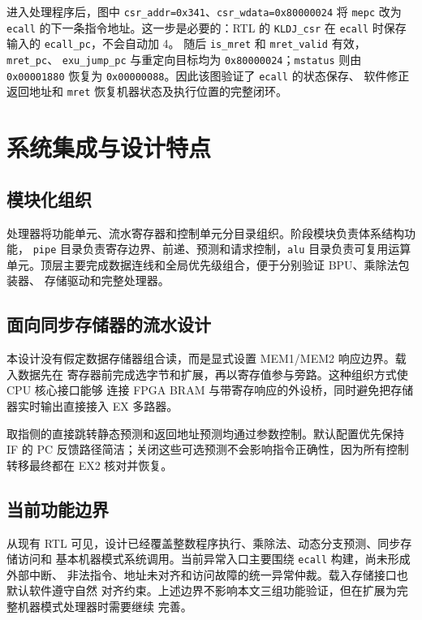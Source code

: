 \documentclass[UTF8,zihao=-4,a4paper]{ctexart}
\numberwithin{table}{section}
\numberwithin{figure}{section}
\newcommand{\code}[1]{\texttt{#1}}
\begin{document}
进入处理程序后，图中 \code{csr\_addr=0x341}、\code{csr\_wdata=0x80000024} 将
\code{mepc} 改为 \code{ecall} 的下一条指令地址。这一步是必要的：RTL 的
\code{KLDJ\_csr} 在 \code{ecall} 时保存输入的 \code{ecall\_pc}，不会自动加 4。
随后 \code{is\_mret} 和 \code{mret\_valid} 有效，\code{mret\_pc}、
\code{exu\_jump\_pc} 与重定向目标均为 \code{0x80000024}；\code{mstatus} 则由
\code{0x00001880} 恢复为 \code{0x00000088}。因此该图验证了 \code{ecall} 的状态保存、
软件修正返回地址和 \code{mret} 恢复机器状态及执行位置的完整闭环。

\section{系统集成与设计特点}

\subsection{模块化组织}

处理器将功能单元、流水寄存器和控制单元分目录组织。阶段模块负责体系结构功能，
\code{pipe} 目录负责寄存边界、前递、预测和请求控制，\code{alu} 目录负责可复用运算
单元。顶层主要完成数据连线和全局优先级组合，便于分别验证 BPU、乘除法包装器、
存储驱动和完整处理器。

\subsection{面向同步存储器的流水设计}

本设计没有假定数据存储器组合读，而是显式设置 MEM1/MEM2 响应边界。载入数据先在
寄存器前完成选字节和扩展，再以寄存值参与旁路。这种组织方式使 CPU 核心接口能够
连接 FPGA BRAM 与带寄存响应的外设桥，同时避免把存储器实时输出直接接入 EX 多路器。

取指侧的直接跳转静态预测和返回地址预测均通过参数控制。默认配置优先保持 IF 的 PC
反馈路径简洁；关闭这些可选预测不会影响指令正确性，因为所有控制转移最终都在 EX2
核对并恢复。

\subsection{当前功能边界}

从现有 RTL 可见，设计已经覆盖整数程序执行、乘除法、动态分支预测、同步存储访问和
基本机器模式系统调用。当前异常入口主要围绕 \code{ecall} 构建，尚未形成外部中断、
非法指令、地址未对齐和访问故障的统一异常仲裁。载入存储接口也默认软件遵守自然
对齐约束。上述边界不影响本文三组功能验证，但在扩展为完整机器模式处理器时需要继续
完善。
\end{document}
